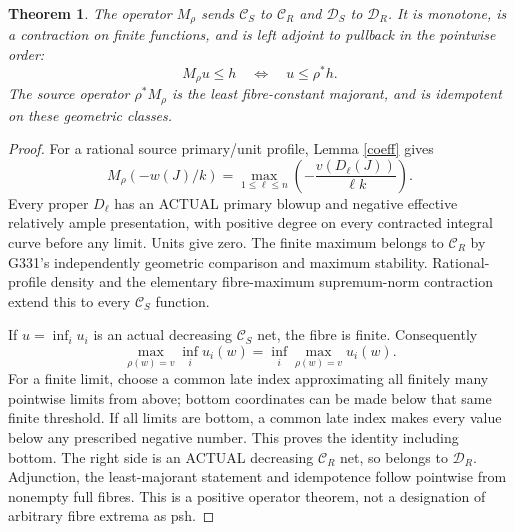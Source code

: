 \documentclass[11pt]{article}
\newtheorem{theorem}{Theorem}
\newcommand{\C}{\mathcal C}
\newcommand{\D}{\mathcal D}
\begin{document}
\begin{theorem}\label{max}
The operator $M_\rho$ sends $\C_S$ to $\C_R$ and $\D_S$ to $\D_R$.
It is monotone, is a contraction on finite functions, and is left adjoint
to pullback in the pointwise order:
\[
 M_\rho u\le h\quad\Longleftrightarrow\quad u\le\rho^*h.
\]
The source operator $\rho^*M_\rho$ is the least fibre-constant majorant,
and is idempotent on these geometric classes.
\end{theorem}
\begin{proof}
For a rational source primary/unit profile, Lemma \ref{coeff} gives
\[
 M_\rho(-w(J)/k)
   =\max_{1\le\ell\le n}
          \left(-\frac{v(D_\ell(J))}{\ell k}\right).
\]
Every proper $D_\ell$ has an ACTUAL primary blowup and negative effective
relatively ample presentation, with positive degree on every contracted
integral curve before any limit. Units give zero. The finite maximum
belongs to $\C_R$ by G331's independently geometric comparison and maximum
stability. Rational-profile density and the elementary fibre-maximum
supremum-norm contraction extend this to every $\C_S$ function.

If $u=\inf_i u_i$ is an actual decreasing $\C_S$ net, the fibre is finite.
Consequently
\[
 \max_{\rho(w)=v}\inf_i u_i(w)=\inf_i\max_{\rho(w)=v}u_i(w).
\]
For a finite limit, choose a common late index approximating all finitely
many pointwise limits from above; bottom coordinates can be made below
that same finite threshold. If all limits are bottom, a common late index
makes every value below any prescribed negative number. This proves the
identity including bottom. The right side is an ACTUAL decreasing
$\C_R$ net, so belongs to $\D_R$.
Adjunction, the least-majorant statement and idempotence follow pointwise
from nonempty full fibres. This is a positive operator theorem, not a
designation of arbitrary fibre extrema as psh.
\end{proof}
\end{document}
